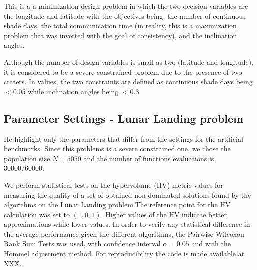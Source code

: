 This is a a minimization design problem in which the two decision variables are the longitude and latitude with the objectives being: the number of continuous shade days, the total communication time (in reality, this is a maximization problem that was inverted with the goal of consistency), and the inclination angles. 

Although the number of design variables is small as two (latitude and longitude), it is considered to be a severe constrained problem due to the presence of two craters. In values, the two constraints are defined as continuous shade days  being $ < 0.05$ while inclination angles being $<0.3$

\subsection{Parameter Settings - Lunar Landing problem}

He highlight only the parameters that differ from the settings for the artificial benchmarks. Since this problems is a severe constrained one, we chose 
the population size $N = 5050$ and the number of functions evaluations is 30000/60000. 

We perform statistical tests on the hypervolume (HV) metric values for measuring the quality of a set of obtained non-dominated solutions found by the algorithms on the Lunar Landing problem.The reference point for the HV calculation was set to $(1, 0, 1)$. Higher values of the HV indicate better approximations while lower values. In order to verify any statistical difference in the average performance given the different algorithms, the Pairwise Wilcoxon Rank Sum Tests was used, with confidence interval $\alpha = 0.05$ and with the Hommel adjustment method. For reproducibility the code is made available at XXX.
